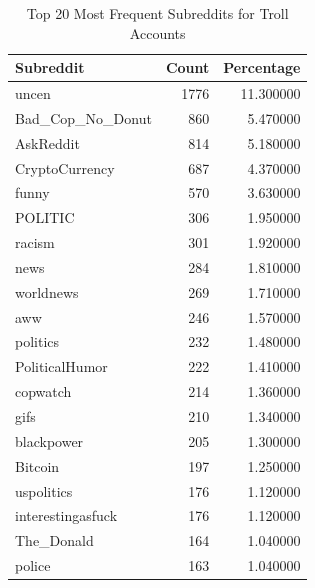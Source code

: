 \begin{table}[htbp]
\caption{Top 20 Most Frequent Subreddits for Troll Accounts}
\label{tab:troll_subreddits}
\begin{tabular}{lrr}
\toprule
Subreddit & Count & Percentage \\
\midrule
uncen & 1776 & 11.300000 \\
Bad_Cop_No_Donut & 860 & 5.470000 \\
AskReddit & 814 & 5.180000 \\
CryptoCurrency & 687 & 4.370000 \\
funny & 570 & 3.630000 \\
POLITIC & 306 & 1.950000 \\
racism & 301 & 1.920000 \\
news & 284 & 1.810000 \\
worldnews & 269 & 1.710000 \\
aww & 246 & 1.570000 \\
politics & 232 & 1.480000 \\
PoliticalHumor & 222 & 1.410000 \\
copwatch & 214 & 1.360000 \\
gifs & 210 & 1.340000 \\
blackpower & 205 & 1.300000 \\
Bitcoin & 197 & 1.250000 \\
uspolitics & 176 & 1.120000 \\
interestingasfuck & 176 & 1.120000 \\
The_Donald & 164 & 1.040000 \\
police & 163 & 1.040000 \\
\bottomrule
\end{tabular}
\end{table}
